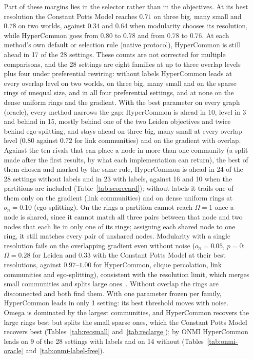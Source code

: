 Part of these margins lies in the selector rather than in the objectives. At its best
resolution the Constant Potts Model reaches $0.71$ on three big, many small and $0.78$ on
two worlds, against $0.34$ and $0.64$ when modularity chooses its resolution, while
HyperCommon goes from $0.80$ to $0.78$ and from $0.78$ to $0.76$. At each method's own
default or selection rule (native protocol), HyperCommon is still ahead in 17 of the 28 settings. These counts are not corrected for multiple comparisons, and the 28 settings are eight families at up to three overlap levels plus four under preferential rewiring: without labels HyperCommon leads at every overlap level on two worlds, on three big, many small and on the sparse rings of unequal size, and in all four preferential settings, and at none on the dense uniform rings and the gradient. With the best parameter on every graph (oracle), every method narrows the gap:
HyperCommon is ahead in 10, level in 3 and behind in 15, mostly behind one of the two
Leiden objectives and twice behind ego-splitting, and stays ahead on three big, many small at every overlap level
($0.80$ against $0.72$ for link communities) and on the gradient with overlap. Against the ten rivals that can place a node in more than one community (a split made after the first results, by what each implementation can return), the best of them chosen and marked by the same rule, HyperCommon is ahead in 24 of the 28 settings without labels and in 23 with labels, against 16 and 10 when the partitions are included (Table~\ref{tab:scorecard}); without labels it trails one of them only on the gradient (link communities) and on dense uniform rings at $o_n=0.10$ (ego-splitting). On the rings a partition cannot reach $\Omega=1$ once a node is shared, since it cannot match all three pairs between that node and two nodes that each lie in only one of its rings; assigning each shared node to one ring, it still matches every pair of unshared nodes.
Modularity with a single resolution fails on the overlapping gradient even without noise ($o_n=0.05$, $p=0$: $\Omega=0.28$ for Leiden and $0.33$ with the Constant Potts Model at their best resolutions, against $0.97$--$1.00$ for HyperCommon, clique percolation, link communities and ego-splitting), consistent with the resolution limit, which merges small communities and splits large ones~\cite{fortunato2007resolution,lancichinetti2011limits}. Without overlap the rings are disconnected and both find them.
With one parameter frozen per family, HyperCommon leads in only 1 setting: its best
threshold moves with noise. Omega is dominated by the largest communities, and
HyperCommon recovers the large rings best but splits the small sparse ones, which the
Constant Potts Model recovers best (Tables~\ref{tab:recsmall} and~\ref{tab:reclarge});
by ONMI HyperCommon leads on 9 of the 28 settings with labels and on 14 without
(Tables~\ref{tab:onmi-oracle} and~\ref{tab:onmi-label-free}).

